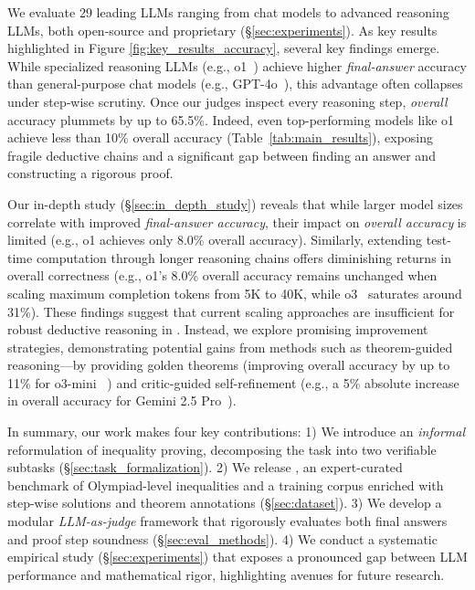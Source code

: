 We evaluate 29 leading LLMs ranging from chat models to advanced reasoning LLMs, both open-source and proprietary  (\S\ref{sec:experiments}). As key results highlighted in Figure \ref{fig:key_results_accuracy}, several key findings emerge. While specialized reasoning LLMs (e.g., o1~\cite{openai2024o1}) achieve higher \emph{final-answer} accuracy than general-purpose chat models (e.g., GPT-4o~\cite{openai2024gpt4o}), this advantage often collapses under step‑wise scrutiny. Once our judges inspect every reasoning step, \textit{overall} accuracy plummets by up to 65.5\%. Indeed, even top-performing models like o1 achieve less than 10\% overall accuracy (Table~\ref{tab:main_results}), exposing fragile deductive chains and a significant gap between finding an answer and constructing a rigorous proof.

Our in-depth study (\S\ref{sec:in_depth_study}) reveals that while larger model sizes correlate with improved \emph{final-answer accuracy}, their impact on \emph{overall accuracy} is limited (e.g., o1 achieves only 8.0\% overall accuracy). Similarly, extending test-time computation through longer reasoning chains offers diminishing returns in overall correctness (e.g., o1's 8.0\% overall accuracy remains unchanged when scaling maximum completion tokens from 5K to 40K, while o3~\citep{openai2025o4mini} saturates around 31\%). These findings suggest that current scaling approaches are insufficient for robust deductive reasoning in \dataset. Instead, we explore promising improvement strategies, demonstrating potential gains from methods such as theorem-guided reasoning—by providing golden theorems (improving overall accuracy by up to 11\% for o3-mini~\citep{OpenAI2025o3mini} ) and critic-guided self-refinement (e.g., a 5\% absolute increase in overall accuracy for Gemini 2.5 Pro~\citep{google2025gemini2.5pro}).

In summary, our work makes four key contributions:
1) We introduce an \textit{informal} reformulation of inequality proving, decomposing the task into two verifiable subtasks (\S\ref{sec:task_formalization}).
2) We release \dataset, an expert-curated benchmark of Olympiad-level inequalities and a training corpus enriched with step-wise solutions and theorem annotations (\S\ref{sec:dataset}).
3) We develop a modular \textit{LLM-as-judge} framework that rigorously evaluates both final answers and proof step soundness (\S\ref{sec:eval_methods}).
4) We conduct a systematic empirical study (\S\ref{sec:experiments}) that exposes a pronounced gap between LLM performance and mathematical rigor, highlighting avenues for future research.

